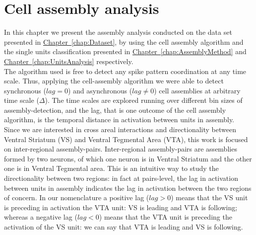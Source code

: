 \chapter{Cell assembly analysis}
\label{chap:AssemblyAnalysis}
In this chapter we present the assembly analysis conducted on the data set presented in \hyperref[chap:Dataset]{Chapter~\ref*{chap:Dataset}}, by using the cell assembly algorithm and the single units classification presented in \hyperref[chap:AssemblyMethod]{Chapter~\ref*{chap:AssemblyMethod}} and \hyperref[chap:UnitsAnalysis]{Chapter~\ref*{chap:UnitsAnalysis}} respectively.\\
The algorithm used is free to detect any spike pattern coordination at any time scale. Thus, applying the cell-assembly algorithm we were able to detect synchronous ($lag=0$) and asynchronous ($lag\neq 0$) cell assemblies at arbitrary time scale ($\Delta$). The time scales are explored running over different bin sizes of assembly-detection, and the lag, that is one outcome of the cell assembly algorithm, is the temporal distance in activation between units in assembly.\\
Since we are interested in cross areal interactions and directionality between Ventral Striatum (VS) and Ventral Tegmental Area (VTA), this work is focused on inter-regional assembly-pairs. Inter-regional assembly-pairs are assemblies formed by two neurons, of which one neuron is in Ventral Striatum and the other one is in Ventral Tegmental area. This is  an intuitive way to study the directionality between two regions: in fact at pairs-level, the lag in activation between units in assembly indicates the lag in activation between the two regions of concern. In our nomenclature a positive lag ($lag>0$) means that the VS unit is preceding in activation the VTA unit: VS is leading and VTA is following; whereas a negative lag ($lag<0$) means that the VTA unit is preceding the activation of the VS unit: we can say that VTA is leading and VS is following. 

